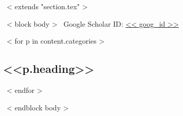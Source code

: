 ~< extends "section.tex" >~

~< block body >~
\vspace{-6mm}
\hfill
Google Scholar ID:
\href{https://scholar.google.com/citations?user=<< goog_id >>}{<< goog_id >>}
\vspace{2mm}

\renewcommand*{\bibfont}{\small}

~< for p in content.categories >~
\subsection{<<p.heading>>}
\begin{refsection}
\nocite{*}
\printbibliography[heading=none,prefixnumbers=<<p.prefix>>]
\end{refsection}
~< endfor >~

~< endblock body >~
